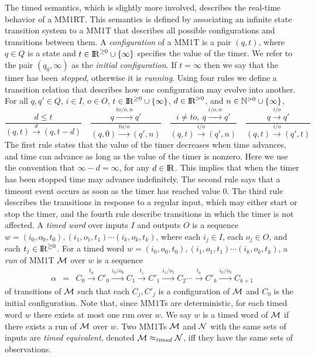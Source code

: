 The timed semantics, which is slightly more involved, describes the real-time behavior of a MM1RT.
This semantics is defined by associating an infinite state transition system to a MM1T that describes all possible
configurations and transitions between them.
A \emph{configuration} of a MM1T is a pair $(q,t)$, where $q \in Q$ is a state and $t \in {\rm I\!R}^{\geq 0} \cup \{\infty\}$ 
specifies the value of the timer. We refer to the pair $(q_0, \infty)$ as the \emph{initial configuration}.
If $t = \infty$ then we say that the timer has been \emph{stopped}, otherwise it is \emph{running}.
Using four rules we define a transition relation that describes how one configuration may evolve into another.
For all $q, q' \in Q$, $i \in I$, $o \in O$, $t \in {\rm I\!R}^{\geq 0} \cup \{\infty\}$, $d \in {\rm I\!R}^{>0}$, and
$n \in {\mathbb N}^{>0} \cup \{ \infty \}$,
\[
\frac{d \leq t}{(q,t) \xrightarrow{d} (q,t-d)} \hspace{1em}
\frac{q \xrightarrow{\mathit{to}/o,n} q'}{(q,0) \xrightarrow{\mathit{to}/o} (q',n)} \hspace{1em}
\frac{i \neq \mathit{to} ,~  q \xrightarrow{i/o,n} q'}{(q,t) \xrightarrow{i/o} (q',n)} \hspace{1em}
\frac{q\xrightarrow{i/o} q'}{(q,t) \xrightarrow{i/o} (q',t)}
\]
The first rule states that the value of the timer decreases when time advances, and
time can advance as long as the value of the timer is nonzero.
Here we use the convention that $\infty - d = \infty$, for any $d \in {\rm I\!R}$. This implies that when the
timer has been stopped time may advance indefinitely.
The second rule says that a timeout event occurs as soon as the timer has reached value $0$.
The third rule describes the transitions in response to a regular input, which may either start or stop the timer,
and the fourth rule describe transitions in which the timer is not affected.
A \emph{timed word} over inputs $I$ and outputs $O$ is a sequence $w = (i_0, o_0, t_0), (i_1, o_1, t_1) \cdots (i_k, o_k, t_k)$, where each $i_j \in I$, each $o_j \in O$, and each $t_j \in {\rm I\!R}^{\geq 0}$.
For a timed word $w = (i_0, o_0, t_0), (i_1, o_1, t_1) \cdots (i_k, o_k, t_k)$, a \emph{run} of MM1T ${\cal M}$ over $w$ is
a sequence 
\begin{eqnarray*}
\alpha & = & C_0 \xrightarrow{t_0} C'_0 \xrightarrow{i_0/o_0} C_1 \xrightarrow{t_1} C'_1 \xrightarrow{i_1/o_1} C_2 \cdots
\xrightarrow{t_k} C'_k \xrightarrow{i_k/o_k} C_{k+1}
\end{eqnarray*}
of transitions of ${\cal M}$ such that each $C_j, C'_j$ is a configuration of ${\cal M}$ and $C_0$ is the initial configuration.
Note that, since MM1Ts are deterministic, for each timed word $w$ there exists at most one run over $w$.
We say $w$ is a timed word of ${\cal M}$ if there exists a run of ${\cal M}$ over $w$.
Two MM1Ts ${\cal M}$ and ${\cal N}$ with the same sets of inputs are \emph{timed equivalent}, denoted ${\cal M} \approx_{\mathit{timed}} {\cal N}$, iff 
they have the same sets of observations.

